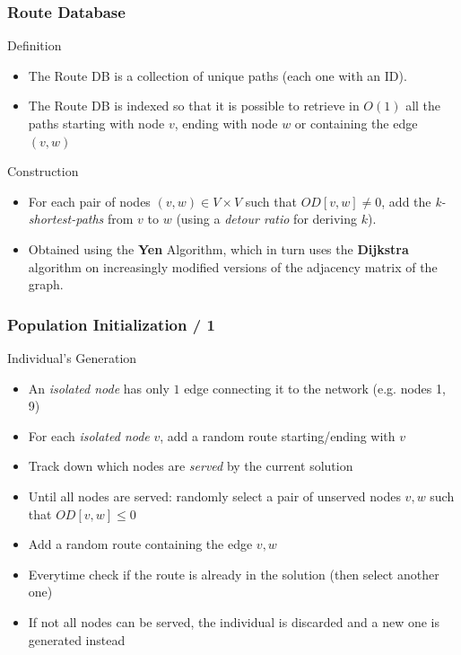 \documentclass[dvipsnames]{beamer}
\begin{document}
\begin{frame}
  \frametitle{Route Database}

  \begin{block}{Definition}
    \begin{itemize}
      \item The Route DB is a collection of unique paths (each one with an ID).
      \item The Route DB is indexed so that it is possible to retrieve in $O(1)$ all the paths starting with node $v$, ending with node $w$ or containing the edge $(v, w)$
    \end{itemize}
  \end{block}

  \begin{block}{Construction}
    \begin{itemize}
      \item For each pair of nodes $(v, w) \in V \times V$ such that $OD[v, w] \neq 0$, add the \textit{k-shortest-paths} from $v$ to $w$ (using a \textit{detour ratio} for deriving $k$).
      \item Obtained using the \textbf{Yen} Algorithm, which in turn uses the \textbf{Dijkstra} algorithm on increasingly modified versions of the adjacency matrix of the graph.
    \end{itemize}
  \end{block}
\end{frame}

\begin{frame}
  \frametitle{Population Initialization / 1}
  \begin{block}{Individual's Generation}
    \begin{itemize}
      \item An \textit{isolated node} has only $1$ edge connecting it to the network (e.g. nodes 1, 9)
      \item For each \textit{isolated node} $v$, add a random route starting/ending with $v$
      \item Track down which nodes are \textit{served} by the current solution
      \item Until all nodes are served: randomly select a pair of unserved nodes $v, w$ such that $OD[v, w] \leq 0$
      \item Add a random route containing the edge $v, w$
      \item Everytime check if the route is already in the solution (then select another one)
      \item If not all nodes can be served, the individual is discarded and a new one is generated instead
    \end{itemize}
  \end{block}
\end{frame}
\end{document}
